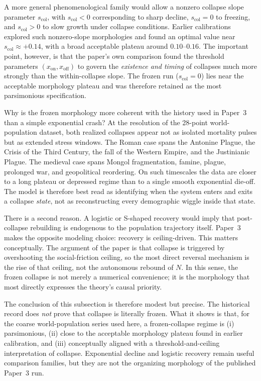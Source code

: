 \documentclass[11pt]{article}
\newcommand{\xon}{x_{\mathrm{on}}}
\newcommand{\xoff}{x_{\mathrm{off}}}
\begin{document}
A more general phenomenological family would allow a nonzero collapse slope parameter $s_{\mathrm{col}}$, with $s_{\mathrm{col}}<0$ corresponding to sharp decline, $s_{\mathrm{col}}=0$ to freezing, and $s_{\mathrm{col}}>0$ to slow growth under collapse conditions. Earlier calibrations explored such nonzero-slope morphologies and found an optimal value near $s_{\mathrm{col}}\approx +0.14$, with a broad acceptable plateau around $0.10$--$0.16$. The important point, however, is that the paper's own comparison found the threshold parameters $(\xon,\xoff)$ to govern the \emph{existence and timing} of collapses much more strongly than the within-collapse slope. The frozen run ($s_{\mathrm{col}}=0$) lies near the acceptable morphology plateau and was therefore retained as the most parsimonious specification.

Why is the frozen morphology more coherent with the history used in Paper~3 than a simple exponential crash? At the resolution of the 28-point world-population dataset, both realized collapses appear not as isolated mortality pulses but as extended stress windows. The Roman case spans the Antonine Plague, the Crisis of the Third Century, the fall of the Western Empire, and the Justinianic Plague. The medieval case spans Mongol fragmentation, famine, plague, prolonged war, and geopolitical reordering. On such timescales the data are closer to a long plateau or depressed regime than to a single smooth exponential die-off. The model is therefore best read as identifying when the system enters and exits a collapse \emph{state}, not as reconstructing every demographic wiggle inside that state.

There is a second reason. A logistic or S-shaped recovery would imply that post-collapse rebuilding is endogenous to the population trajectory itself. Paper~3 makes the opposite modeling choice: recovery is ceiling-driven. This matters conceptually. The argument of the paper is that collapse is triggered by overshooting the social-friction ceiling, so the most direct reversal mechanism is the rise of that ceiling, not the autonomous rebound of $N$. In this sense, the frozen collapse is not merely a numerical convenience; it is the morphology that most directly expresses the theory's causal priority.

The conclusion of this subsection is therefore modest but precise. The historical record does \emph{not} prove that collapse is literally frozen. What it shows is that, for the coarse world-population series used here, a frozen-collapse regime is (i) parsimonious, (ii) close to the acceptable morphology plateau found in earlier calibration, and (iii) conceptually aligned with a threshold-and-ceiling interpretation of collapse. Exponential decline and logistic recovery remain useful comparison families, but they are not the organizing morphology of the published Paper~3 run.
\end{document}
